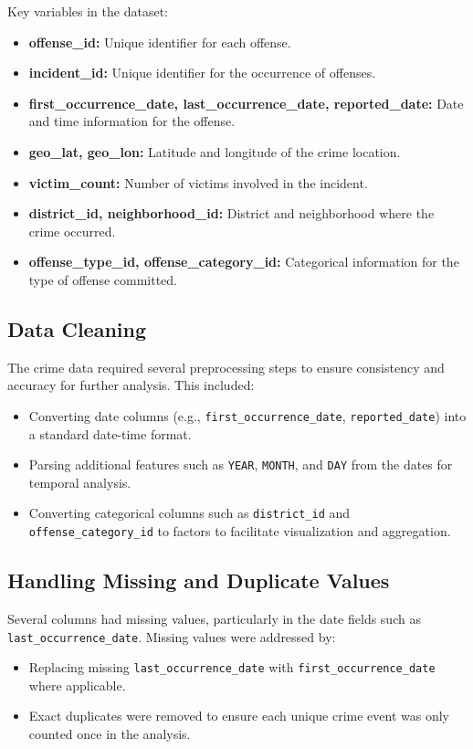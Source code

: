 \documentclass{article}
\begin{document}
Key variables in the dataset:
\begin{itemize}
    \item \textbf{offense\_id:} Unique identifier for each offense.
    \item \textbf{incident\_id:} Unique identifier for the occurrence of offenses.
    \item \textbf{first\_occurrence\_date, last\_occurrence\_date, reported\_date:} Date and time information for the offense.
    \item \textbf{geo\_lat, geo\_lon:} Latitude and longitude of the crime location.
    \item \textbf{victim\_count:} Number of victims involved in the incident.
    \item \textbf{district\_id, neighborhood\_id:} District and neighborhood where the crime occurred.
    \item \textbf{offense\_type\_id, offense\_category\_id:} Categorical information for the type of offense committed.
\end{itemize}

\subsection{Data Cleaning}
The crime data required several preprocessing steps to ensure consistency and accuracy for further analysis. This included:
\begin{itemize}
    \item Converting date columns (e.g., \texttt{first\_occurrence\_date}, \texttt{reported\_date}) into a standard date-time format.
    \item Parsing additional features such as \texttt{YEAR}, \texttt{MONTH}, and \texttt{DAY} from the dates for temporal analysis.
    \item Converting categorical columns such as \texttt{district\_id} and \texttt{offense\_category\_id} to factors to facilitate visualization and aggregation.
\end{itemize}

\subsection{Handling Missing and Duplicate Values}
Several columns had missing values, particularly in the date fields such as \texttt{last\_occurrence\_date}. Missing values were addressed by:
\begin{itemize}
    \item Replacing missing \texttt{last\_occurrence\_date} with \texttt{first\_occurrence\_date} where applicable.
    \item Exact duplicates were removed to ensure each unique crime event was only counted once in the analysis.
\end{itemize}
\end{document}
